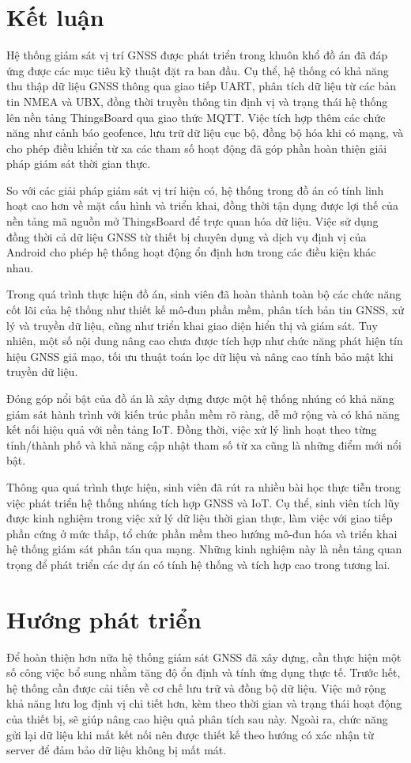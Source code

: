 \documentclass[../DoAn.tex]{subfiles}
\begin{document}
\section{Kết luận}
\label{section:6.1}
Hệ thống giám sát vị trí GNSS được phát triển trong khuôn khổ đồ án đã đáp ứng được các mục tiêu kỹ thuật đặt ra ban đầu. Cụ thể, hệ thống có khả năng thu thập dữ liệu GNSS thông qua giao tiếp UART, phân tích dữ liệu từ các bản tin NMEA và UBX, đồng thời truyền thông tin định vị và trạng thái hệ thống lên nền tảng ThingsBoard qua giao thức MQTT. Việc tích hợp thêm các chức năng như cảnh báo geofence, lưu trữ dữ liệu cục bộ, đồng bộ hóa khi có mạng, và cho phép điều khiển từ xa các tham số hoạt động đã góp phần hoàn thiện giải pháp giám sát thời gian thực.

So với các giải pháp giám sát vị trí hiện có, hệ thống trong đồ án có tính linh hoạt cao hơn về mặt cấu hình và triển khai, đồng thời tận dụng được lợi thế của nền tảng mã nguồn mở ThingsBoard để trực quan hóa dữ liệu. Việc sử dụng đồng thời cả dữ liệu GNSS từ thiết bị chuyên dụng và dịch vụ định vị của Android cho phép hệ thống hoạt động ổn định hơn trong các điều kiện khác nhau.

Trong quá trình thực hiện đồ án, sinh viên đã hoàn thành toàn bộ các chức năng cốt lõi của hệ thống như thiết kế mô-đun phần mềm, phân tích bản tin GNSS, xử lý và truyền dữ liệu, cũng như triển khai giao diện hiển thị và giám sát. Tuy nhiên, một số nội dung nâng cao chưa được tích hợp như chức năng phát hiện tín hiệu GNSS giả mạo, tối ưu thuật toán lọc dữ liệu và nâng cao tính bảo mật khi truyền dữ liệu.

Đóng góp nổi bật của đồ án là xây dựng được một hệ thống nhúng có khả năng giám sát hành trình với kiến trúc phần mềm rõ ràng, dễ mở rộng và có khả năng kết nối hiệu quả với nền tảng IoT. Đồng thời, việc xử lý linh hoạt theo từng tỉnh/thành phố và khả năng cập nhật tham số từ xa cũng là những điểm mới nổi bật.

Thông qua quá trình thực hiện, sinh viên đã rút ra nhiều bài học thực tiễn trong việc phát triển hệ thống nhúng tích hợp GNSS và IoT. Cụ thể, sinh viên tích lũy được kinh nghiệm trong việc xử lý dữ liệu thời gian thực, làm việc với giao tiếp phần cứng ở mức thấp, tổ chức phần mềm theo hướng mô-đun hóa và triển khai hệ thống giám sát phân tán qua mạng. Những kinh nghiệm này là nền tảng quan trọng để phát triển các dự án có tính hệ thống và tích hợp cao trong tương lai.

\section{Hướng phát triển}
\label{section:6.2}
Để hoàn thiện hơn nữa hệ thống giám sát GNSS đã xây dựng, cần thực hiện một số công việc bổ sung nhằm tăng độ ổn định và tính ứng dụng thực tế. Trước hết, hệ thống cần được cải tiến về cơ chế lưu trữ và đồng bộ dữ liệu. Việc mở rộng khả năng lưu log định vị chi tiết hơn, kèm theo thời gian và trạng thái hoạt động của thiết bị, sẽ giúp nâng cao hiệu quả phân tích sau này. Ngoài ra, chức năng gửi lại dữ liệu khi mất kết nối nên được thiết kế theo hướng có xác nhận từ server để đảm bảo dữ liệu không bị mất mát.
\end{document}
